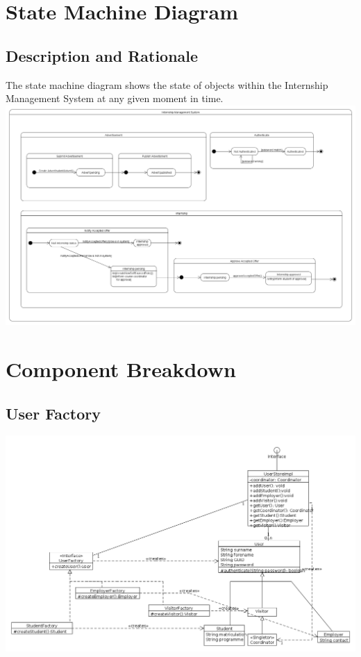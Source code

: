 \documentclass{l3deliverable}
\begin{document}
\section{State Machine Diagram}
\subsection{Description and Rationale}
The state machine diagram shows the state of objects within the Internship Management System at any given moment in time.\\
\includegraphics[scale = 0.25]{StateMachineDiagram.png}\\


\section{Component Breakdown}

\subsection{User Factory}
\includegraphics[scale = 0.35]{UserFactoryComponent.png}
\end{document}
